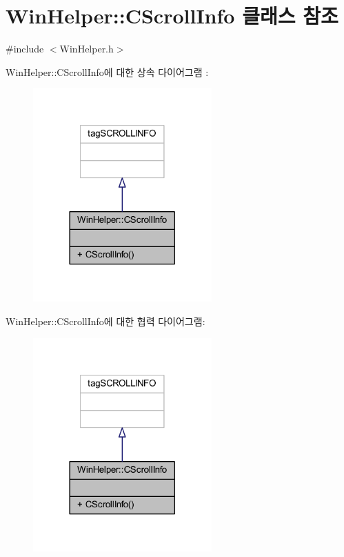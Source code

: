 \hypertarget{class_win_helper_1_1_c_scroll_info}{}\section{Win\+Helper\+:\+:C\+Scroll\+Info 클래스 참조}
\label{class_win_helper_1_1_c_scroll_info}


{\ttfamily \#include $<$Win\+Helper.\+h$>$}



Win\+Helper\+:\+:C\+Scroll\+Info에 대한 상속 다이어그램 \+: \nopagebreak
\begin{figure}[H]
\begin{center}
\leavevmode
\includegraphics[width=194pt]{class_win_helper_1_1_c_scroll_info__inherit__graph}
\end{center}
\end{figure}


Win\+Helper\+:\+:C\+Scroll\+Info에 대한 협력 다이어그램\+:\nopagebreak
\begin{figure}[H]
\begin{center}
\leavevmode
\includegraphics[width=194pt]{class_win_helper_1_1_c_scroll_info__coll__graph}
\end{center}
\end{figure}
